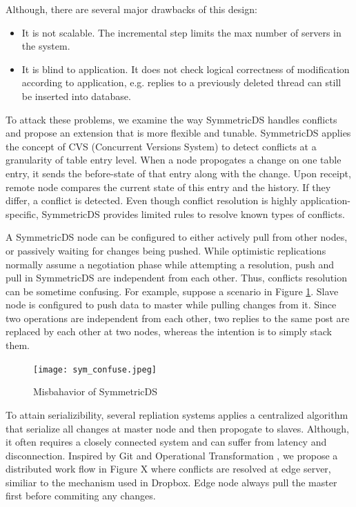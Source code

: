 Although, there are several major drawbacks of this design:
\begin{itemize}
\item It is not scalable. The incremental step limits the max number of servers in the system.
\item It is blind to application. It does not check logical correctness of modification according to application, e.g. replies to a previously deleted thread can still be inserted into database.
\end{itemize}

To attack these problems, we examine the way SymmetricDS handles conflicts and propose an extension that is more flexible and tunable. SymmetricDS applies the concept of CVS (Concurrent Versions System) to detect conflicts at a granularity of table entry level. When a node propogates a change on one table entry, it sends the before-state of that entry along with the change. Upon receipt, remote node compares the current state of this entry and the history. If they differ, a conflict is detected. Even though conflict resolution is highly application-specific, SymmetricDS provides limited rules to resolve known types of conflicts.

A SymmetricDS node can be configured to either actively pull from other nodes, or passively waiting for changes being pushed. While optimistic replications normally assume a negotiation phase while attempting a resolution, push and pull in SymmetricDS are independent from each other. Thus, conflicts resolution can be sometime confusing. For example, suppose a scenario in Figure \ref{sym_confuse}. Slave node is configured to push data to master while pulling changes from it. Since two operations are independent from each other, two replies to the same post are replaced by each other at two nodes, whereas the intention is to simply stack them.

\begin{figure}[htbp]
\centering
\texttt{[image: sym\_confuse.jpeg]}
\caption{Misbahavior of SymmetricDS}
\label{sym_confuse}
\end{figure}

To attain serializibility, several repliation systems applies a centralized algorithm that serialize all changes at master node and then propogate to slaves. Although, it often requires a closely connected system and can suffer from latency and disconnection. Inspired by Git and Operational Transformation \cite{ellis1989concurrency}, we propose a distributed work flow in Figure X where conflicts are resolved at edge server, similiar to the mechanism used in Dropbox\cite{dropbox}. Edge node always pull the master first before commiting any changes. 

